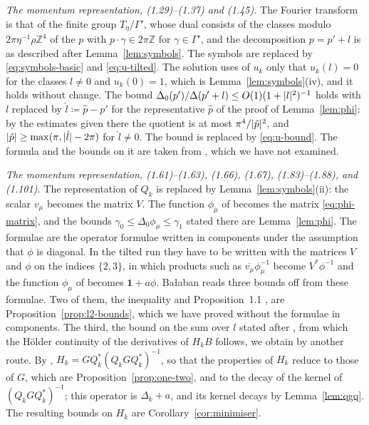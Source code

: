 \documentclass[11pt]{preprint}
\newcommand{\id}{\mathbf 1}
\DeclarePairedDelimiter{\abs}{\lvert}{\rvert}
\numberwithin{equation}{section}
\theoremstyle{definition}
\theoremstyle{remark}
\theoremstyle{plain}
\begin{document}
\emph{The momentum representation, (1.29)--(1.37) and (1.45).} The Fourier transform \cite[(1.29)]{BalabanPRT1} is that of the finite group $T_\eta/\Gamma'$, whose dual consists of the classes modulo $2\pi\eta^{-1}\rho\mathbb Z^4$ of the $p$ with $p \cdot \gamma \in 2\pi\mathbb Z$ for $\gamma \in \Gamma'$, and the decomposition $p = p' + l$ is as described after Lemma~\ref{lem:symbols}. The symbols \cite[(1.31)]{BalabanPRT1} are replaced by \eqref{eq:symbols-basic} and \eqref{eq:u-tilted}. The solution \cite[(1.32)--(1.35), (1.37)]{BalabanPRT1} uses of $u_k$ only that $u_k(l) = 0$ for the classes $l \neq 0$ and $u_k(0) = 1$, which is Lemma~\ref{lem:symbols}(iv), and it holds without change. The bound $\Delta_0(p')/\Delta(p' + l) \leq O(1)(1 + \abs{l}^2)^{-1}$ holds with $l$ replaced by $\hat l \coloneqq \hat p - p'$ for the representative $\hat p$ of the proof of Lemma~\ref{lem:phi}: by the estimates given there the quotient is at most $\pi^4/\abs{\hat p}^2$, and $\abs{\hat p} \geq \max(\pi, \abs{\hat l} - 2\pi)$ for $\hat l \neq 0$. The bound \cite[(1.36)]{BalabanPRT1} is replaced by \eqref{eq:u-bound}. The formula \cite[(1.45)]{BalabanPRT1} and the bounds on it are taken from \cite{BalabanRDG}, which we have not examined.

\emph{The momentum representation, (1.61)--(1.63), (1.66), (1.67), (1.83)--(1.88), and (1.101).} The representation \cite[(1.61)]{BalabanPRT1} of $Q_k$ is replaced by Lemma~\ref{lem:symbols}(ii): the scalar $v_\mu$ becomes the matrix $V$. The function $\phi_\mu$ of \cite[(1.62)]{BalabanPRT1} becomes the matrix \eqref{eq:phi-matrix}, and the bounds $\gamma_0 \leq \Delta_0\phi_\mu \leq \gamma_1$ stated there are Lemma~\ref{lem:phi}. The formulae \cite[(1.63), (1.66), (1.83)--(1.88), (1.101)]{BalabanPRT1} are the operator formulae \cite[(1.60), (1.65), (1.81), (1.99)]{BalabanPRT1} written in components under the assumption that $\phi$ is diagonal. In the tilted run they have to be written with the matrices $V$ and $\phi$ on the indices $\{ 2, 3 \}$, in which products such as $\overline{v_\mu}\phi_\mu^{-1}$ become $V^*\phi^{-1}$ and the function $\phi_\mu$ of \cite[(1.84)]{BalabanPRT1} becomes $\id + a\phi$. Ba{\l}aban reads three bounds off from these formulae. Two of them, the inequality \cite[(1.67)]{BalabanPRT1} and Proposition~1.1 \cite[(1.89), (1.90)]{BalabanPRT1}, are Proposition~\ref{prop:l2-bounds}, which we have proved without the formulae in components. The third, the bound on the sum over $l$ stated after \cite[(1.63)]{BalabanPRT1}, from which the H\"older continuity of the derivatives of $H_kB$ follows, we obtain by another route. By \cite[(1.103)]{BalabanPRT1}, $H_k = GQ_k^*(Q_kGQ_k^*)^{-1}$, so that the properties of $H_k$ reduce to those of $G$, which are Proposition~\ref{prop:one-two}, and to the decay of the kernel of $(Q_kGQ_k^*)^{-1}$; this operator is $\Delta_k + a$, and its kernel decays by Lemma~\ref{lem:qgq}. The resulting bounds on $H_k$ are Corollary~\ref{cor:minimiser}.
\end{document}
